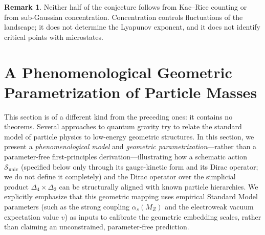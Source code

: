 \documentclass[11pt,a4paper,reqno]{amsart}
\theoremstyle{definition}
\newtheorem{remark}[theorem]{Remark}
\numberwithin{equation}{section}
\begin{document}
\begin{remark}
Neither half of the conjecture follows from Kac--Rice counting or from sub-Gaussian concentration. Concentration controls fluctuations of the landscape; it does not determine the Lyapunov exponent, and it does not identify critical points with microstates.
\end{remark}


\section{A Phenomenological Geometric Parametrization of Particle Masses}
\label{sec:geometric_condensation_interactions}

This section is of a different kind from the preceding ones: it contains no theorems. Several approaches to quantum gravity try to relate the standard model of particle physics to low-energy geometric structures. In this section, we present a \emph{phenomenological model} and \emph{geometric parametrization}—rather than a parameter-free first-principles derivation—illustrating how a schematic action $\mathcal{S}_{\mathrm{univ}}$ (specified below only through its gauge-kinetic form and its Dirac operator; we do not define it completely) and the Dirac operator over the simplicial product $\Delta_4 \times \Delta_2$ can be structurally aligned with known particle hierarchies. We explicitly emphasize that this geometric mapping uses empirical Standard Model parameters (such as the strong coupling $\alpha_s(M_Z)$ and the electroweak vacuum expectation value $v$) as inputs to calibrate the geometric embedding scales, rather than claiming an unconstrained, parameter-free prediction.
\end{document}
